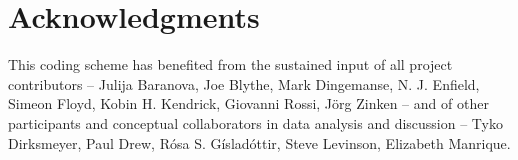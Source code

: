 \documentclass[output=paper]{langsci/langscibook}
\begin{document}
\section*{Acknowledgments}

This coding scheme has benefited from the sustained input of all project contributors -- Julija Baranova, Joe Blythe, Mark Dingemanse, N. J. Enfield, Simeon Floyd, Kobin H. Kendrick, Giovanni Rossi, Jörg Zinken -- and of other participants and conceptual collaborators in data analysis and discussion -- Tyko Dirksmeyer, Paul Drew, Rósa S. Gísladóttir, Steve Levinson, Elizabeth Manrique.

\sloppy
\printbibliography[heading=subbibliography,notkeyword=this]
\end{document}

